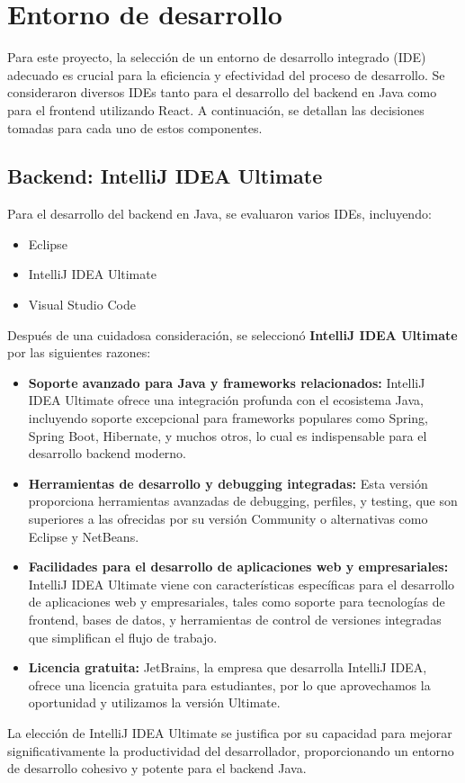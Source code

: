 \section{Entorno de desarrollo}
Para este proyecto, la selección de un entorno de desarrollo integrado (IDE) adecuado es crucial para la eficiencia y efectividad del proceso de desarrollo. Se consideraron diversos IDEs tanto para el desarrollo del backend en Java como para el frontend utilizando React. A continuación, se detallan las decisiones tomadas para cada uno de estos componentes.

\subsection{Backend: IntelliJ IDEA Ultimate}
Para el desarrollo del backend en Java, se evaluaron varios IDEs, incluyendo:
\begin{itemize}
    \item Eclipse
    \item IntelliJ IDEA Ultimate
    \item Visual Studio Code
\end{itemize}
Después de una cuidadosa consideración, se seleccionó \textbf{IntelliJ IDEA Ultimate}\cite{IntelliJ} por las siguientes razones:
\begin{itemize}
    \item \textbf{Soporte avanzado para Java y frameworks relacionados:} IntelliJ IDEA Ultimate ofrece una integración profunda con el ecosistema Java, incluyendo soporte excepcional para frameworks populares como Spring, Spring Boot, Hibernate, y muchos otros, lo cual es indispensable para el desarrollo backend moderno.
    \item \textbf{Herramientas de desarrollo y debugging integradas:} Esta versión proporciona herramientas avanzadas de debugging, perfiles, y testing, que son superiores a las ofrecidas por su versión Community o alternativas como Eclipse y NetBeans.
    \item \textbf{Facilidades para el desarrollo de aplicaciones web y empresariales:} IntelliJ IDEA Ultimate viene con características específicas para el desarrollo de aplicaciones web y empresariales, tales como soporte para tecnologías de frontend, bases de datos, y herramientas de control de versiones integradas que simplifican el flujo de trabajo.
    \item \textbf{Licencia gratuita:} JetBrains, la empresa que desarrolla IntelliJ IDEA, ofrece una licencia gratuita para estudiantes, por lo que aprovechamos la oportunidad y utilizamos la versión Ultimate.
\end{itemize}
La elección de IntelliJ IDEA Ultimate se justifica por su capacidad para mejorar significativamente la productividad del desarrollador, proporcionando un entorno de desarrollo cohesivo y potente para el backend Java.

